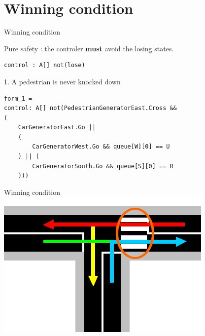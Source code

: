 \documentclass{bredelebeamer}
\begin{document}
\section{Winning condition}
\begin{frame}[fragile]{Winning condition}
\begin{alertblock}{}
Pure safety : the controler \textbf{must} avoid the losing states.
\begin{verbatim}
control : A[] not(lose)
\end{verbatim}
\end{alertblock}



\begin{block}{1. A pedestrian is never knocked down}
\begin{verbatim}
form_1 = 
control: A[] not(PedestrianGeneratorEast.Cross && 
(
    CarGeneratorEast.Go || 
    (
        CarGeneratorWest.Go && queue[W][0] == U
    ) || (
        CarGeneratorSouth.Go && queue[S][0] == R
    )))
\end{verbatim}
\end{block}

\end{frame}
\begin{frame}[fragile]{Winning condition}
\centering
\includegraphics[scale=0.8]{images/pietonCollision.png}

\end{frame}
\end{document}
